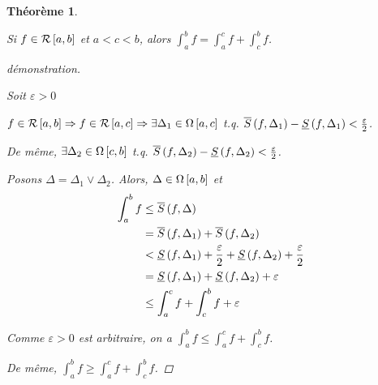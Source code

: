 \documentclass{report}
\newcommand*{\raffinement}[2]{#1 \vee #2}
\newcommand*{\eps}{\varepsilon}
\newtheorem*{thm}{Th\'eor\`eme}
\theoremstyle{definition}
\theoremstyle{remark}
\begin{document}
	\begin{thm}
		~

		Si $f \in \riemann$ et $a<c<b$, alors $\int_{a}^{b}f = \int_{a}^{c}f + \int_{c}^{b}f$.
		\begin{proof}[d\'emonstration]~

			Soit $\eps>0$

			$f \in \riemann \Rightarrow f \in \riemann[a,c] \Rightarrow \exists\Delta_1 \in \partitions[a,c]$ t.q. $\ssup{f}[\Delta_1] - \sinf{f}[\Delta_1] < \frac{\eps}{2}$.

			De m\^eme, $\exists\Delta_2 \in \partitions[c,b]$ t.q. $\ssup{f}[\Delta_2] - \sinf{f}[\Delta_2] < \frac{\eps}{2}$.

			Posons $\Delta = \raffinement{\Delta_1}{\Delta_2}$. Alors, $\Delta \in \partitions$ et
			\begin{align*}
				\int_{a}^{b}f&\leq \ssup{f}\\
				&= \ssup{f}[\Delta_1] + \ssup{f}[\Delta_2]\\
				&< \sinf{f}[\Delta_1] + \frac{\eps}{2} + \sinf{f}[\Delta_2] + \frac{\eps}{2}\\
				&= \sinf{f}[\Delta_1] + \sinf{f}[\Delta_2] + \eps\\
				&\leq \int_{a}^{c}f + \int_{c}^{b}f + \eps
			\end{align*}

			Comme $\eps>0$ est arbitraire, on a $\int_{a}^{b}f \leq \int_{a}^{c}f + \int_{c}^{b}f$.

			De m\^eme, $\int_{a}^{b}f \geq \int_{a}^{c}f + \int_{c}^{b}f$.
		\end{proof}
	\end{thm}
\end{document}
